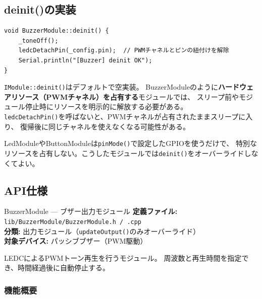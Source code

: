 \subsection{deinit()の実装}

\begin{lstlisting}[style=cppstyle, caption={BuzzerModule.cpp — deinit()}]
void BuzzerModule::deinit() {
    _toneOff();
    ledcDetachPin(_config.pin);  // PWMチャネルとピンの紐付けを解除
    Serial.println("[Buzzer] deinit OK");
}
\end{lstlisting}

\begin{pointbox}
\texttt{IModule::deinit()}はデフォルトで空実装。
BuzzerModuleのように\textbf{ハードウェアリソース（PWMチャネル）を占有する}モジュールでは、
スリープ前やモジュール停止時にリソースを明示的に解放する必要がある。\\
\texttt{ledcDetachPin()}を呼ばないと、PWMチャネルが占有されたままスリープに入り、
復帰後に同じチャネルを使えなくなる可能性がある。
\end{pointbox}

\begin{notebox}
LedModuleやButtonModuleは\texttt{pinMode()}で設定したGPIOを使うだけで、
特別なリソースを占有しない。こうしたモジュールでは\texttt{deinit()}をオーバーライドしなくてよい。
\end{notebox}

\subsection{API仕様}


\begin{apibox}{BuzzerModule --- ブザー出力モジュール}
\textbf{定義ファイル:} \texttt{lib/BuzzerModule/BuzzerModule.h / .cpp}\\
\textbf{分類:} 出力モジュール（\texttt{updateOutput()}のみオーバーライド）\\
\textbf{対象デバイス:} パッシブブザー（PWM駆動）

LEDCによるPWMトーン再生を行うモジュール。
周波数と再生時間を指定でき、時間経過後に自動停止する。
\end{apibox}

\subsubsection{機能概要}

